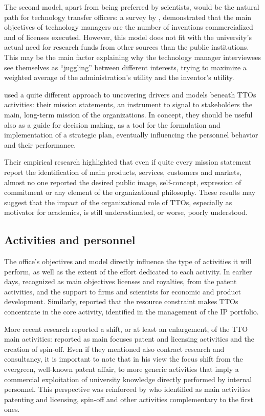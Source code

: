 The second model, apart from being preferred by scientists, would be the natural path for technology transfer officers: a survey by \citet{Jensen1998}, demonstrated that the main objectives of technology managers are the number of inventions commercialized and of licenses executed. However, this model does not fit with the university's actual need for research funds from other sources than the public institutions. This may be the main factor explaining why the technology manager interviewees see themselves as \enquote{juggling} between different interests, trying to maximize a weighted average of the administration's utility and the inventor's utility.

\citet{Fitzgerald2015} used a quite different approach to uncovering drivers and models beneath TTOs activities: their mission statements, an instrument to signal to stakeholders the main, long-term mission of the organizations. In concept, they should be useful also as a guide for decision making, as a tool for the formulation and implementation of a strategic plan, eventually influencing the personnel behavior and their performance.

Their empirical research highlighted that even if quite every mission statement report the identification of main products, services, customers and markets, almost no one reported the desired public image, self-concept, expression of commitment or any element of the organizational philosophy. These results may suggest that the impact of the organizational role of TTOs, especially as motivator for academics, is still underestimated, or worse, poorly understood. 

\subsection{Activities and personnel}

The office's objectives and model directly influence the type of activities it will perform, as well as the extent of the effort dedicated to each activity. In earlier days, \citet{Siegel2003a} recognized as main objectives licenses and royalties, from the patent activities, and the support to firms and scientists for economic and product development. Similarly, \citet{OwenSmith2001} reported that the resource constraint makes TTOs concentrate in the core activity, identified in the management of the IP portfolio.

More recent research reported a shift, or at least an enlargement, of the TTO main activities: \citet{Geuna2009} reported as main focuses patent and licensing activities and the creation of spin-off. Even if they mentioned also contract research and consultancy, it is important to note that in his view the focus shift from the evergreen, well-known patent affair, to more generic activities that imply a commercial exploitation of university knowledge directly performed by internal personnel. This perspective was reinforced by \citet{Balderi2010} who identified as main activities patenting and licensing, spin-off and other activities complementary to the first ones.

